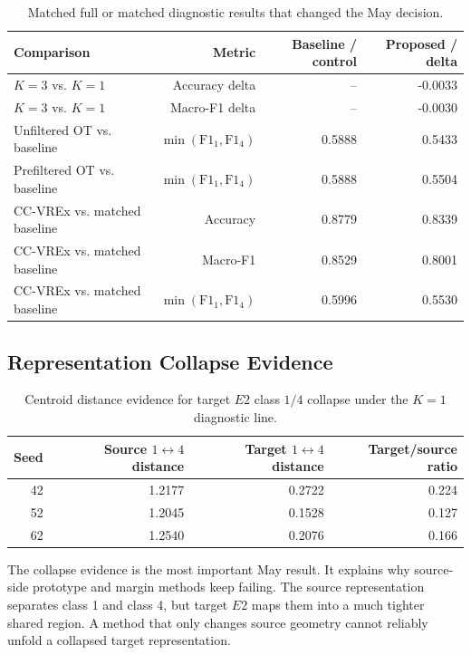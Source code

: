 \documentclass[11pt]{article}
\begin{document}
\begin{table}[H]
\centering
\small
\caption{Matched full or matched diagnostic results that changed the May decision.}
\label{tab:matched_negative}
\begin{tabular}{lrrr}
\toprule
Comparison & Metric & Baseline / control & Proposed / delta \\
\midrule
$K=3$ vs. $K=1$ & Accuracy delta & -- & -0.0033 \\
$K=3$ vs. $K=1$ & Macro-F1 delta & -- & -0.0030 \\
Unfiltered OT vs. baseline & $\min(\mathrm{F1}_1,\mathrm{F1}_4)$ & 0.5888 & 0.5433 \\
Prefiltered OT vs. baseline & $\min(\mathrm{F1}_1,\mathrm{F1}_4)$ & 0.5888 & 0.5504 \\
CC-VREx vs. matched baseline & Accuracy & 0.8779 & 0.8339 \\
CC-VREx vs. matched baseline & Macro-F1 & 0.8529 & 0.8001 \\
CC-VREx vs. matched baseline & $\min(\mathrm{F1}_1,\mathrm{F1}_4)$ & 0.5996 & 0.5530 \\
\bottomrule
\end{tabular}
\end{table}

\subsection{Representation Collapse Evidence}

\begin{table}[H]
\centering
\small
\caption{Centroid distance evidence for target $E2$ class $1/4$ collapse under the $K=1$ diagnostic line.}
\label{tab:collapse}
\begin{tabular}{rrrr}
\toprule
Seed & Source $1\leftrightarrow4$ distance & Target $1\leftrightarrow4$ distance & Target/source ratio \\
\midrule
42 & 1.2177 & 0.2722 & 0.224 \\
52 & 1.2045 & 0.1528 & 0.127 \\
62 & 1.2540 & 0.2076 & 0.166 \\
\bottomrule
\end{tabular}
\end{table}

The collapse evidence is the most important May result. It explains why source-side prototype and margin methods keep failing. The source representation separates class 1 and class 4, but target $E2$ maps them into a much tighter shared region. A method that only changes source geometry cannot reliably unfold a collapsed target representation.
\end{document}
